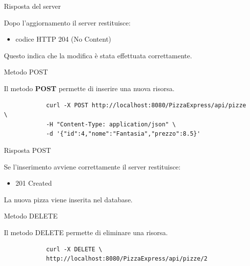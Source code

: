 \documentclass{beamer}
\begin{document}
	
	\begin{frame}{Risposta del server}
		
		Dopo l'aggiornamento il server restituisce:
		
		\begin{itemize}
			\item codice HTTP 204 (No Content)
		\end{itemize}
		
		Questo indica che la modifica è stata effettuata correttamente.
		
	\end{frame}
	
	
	\begin{frame}[fragile]{Metodo POST}
		
		Il metodo \textbf{POST} permette di inserire una nuova risorsa.
		
		\begin{lstlisting}
			curl -X POST http://localhost:8080/PizzaExpress/api/pizze \
			-H "Content-Type: application/json" \
			-d '{"id":4,"nome":"Fantasia","prezzo":8.5}'
		\end{lstlisting}
		
	\end{frame}
	
	
	\begin{frame}{Risposta POST}
		
		Se l'inserimento avviene correttamente il server restituisce:
		
		\begin{itemize}
			\item 201 Created
		\end{itemize}
		
		La nuova pizza viene inserita nel database.
		
	\end{frame}
	
	
	\begin{frame}[fragile]{Metodo DELETE}
		
		Il metodo DELETE permette di eliminare una risorsa.
		
		\begin{lstlisting}
			curl -X DELETE \
			http://localhost:8080/PizzaExpress/api/pizze/2
		\end{lstlisting}
		
	\end{frame}
	
\end{document}
